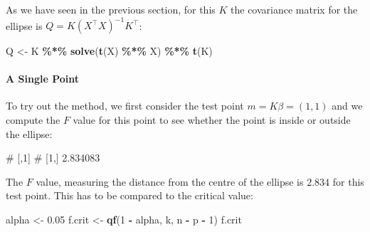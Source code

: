 \documentclass[
  a4paper,
]{article}
\newenvironment{Shaded}{\begin{snugshade}}{\end{snugshade}}
\newcommand{\DecValTok}[1]{\textcolor[rgb]{0.00,0.00,0.81}{#1}}
\newcommand{\FloatTok}[1]{\textcolor[rgb]{0.00,0.00,0.81}{#1}}
\newcommand{\FunctionTok}[1]{\textcolor[rgb]{0.13,0.29,0.53}{\textbf{#1}}}
\newcommand{\NormalTok}[1]{#1}
\newcommand{\OtherTok}[1]{\textcolor[rgb]{0.56,0.35,0.01}{#1}}
\newcommand{\SpecialCharTok}[1]{\textcolor[rgb]{0.81,0.36,0.00}{\textbf{#1}}}
\theoremstyle{definition}
\theoremstyle{definition}
\theoremstyle{definition}
\theoremstyle{definition}
\theoremstyle{remark}
\begin{document}
As we have seen in the previous section, for this \(K\) the covariance matrix for
the ellipse is \(Q = K (X^\top X)^{-1} K^\top\):

\begin{Shaded}
\begin{Highlighting}[]
\NormalTok{Q }\OtherTok{\textless{}{-}}\NormalTok{ K }\SpecialCharTok{\%*\%} \FunctionTok{solve}\NormalTok{(}\FunctionTok{t}\NormalTok{(X) }\SpecialCharTok{\%*\%}\NormalTok{ X) }\SpecialCharTok{\%*\%} \FunctionTok{t}\NormalTok{(K)}
\end{Highlighting}
\end{Shaded}

\paragraph{A Single Point}\label{a-single-point}

To try out the method, we first consider the test point \(m = K\beta = (1, 1)\)
and we compute the \(F\) value for this point to see whether the point is
inside or outside the ellipse:

\begin{Shaded}
\end{Shaded}

\begin{Shaded}
\begin{Highlighting}[]
\NormalTok{\#          [,1]}
\NormalTok{\# [1,] 2.834083}
\end{Highlighting}
\end{Shaded}

The \(F\) value, measuring the distance from the centre of the ellipse
is \(2.834\) for this test point. This has to be compared to the
critical value:

\begin{Shaded}
\begin{Highlighting}[]
\NormalTok{alpha }\OtherTok{\textless{}{-}} \FloatTok{0.05}
\NormalTok{f.crit }\OtherTok{\textless{}{-}} \FunctionTok{qf}\NormalTok{(}\DecValTok{1} \SpecialCharTok{{-}}\NormalTok{ alpha, k, n }\SpecialCharTok{{-}}\NormalTok{ p }\SpecialCharTok{{-}} \DecValTok{1}\NormalTok{)}
\NormalTok{f.crit}
\end{Highlighting}
\end{Shaded}
\end{document}
